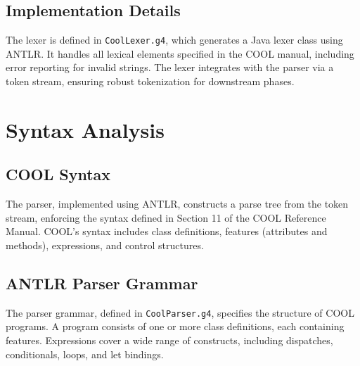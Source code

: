 \documentclass[titlepage]{article}
\begin{document}
\subsection{Implementation Details}

The lexer is defined in \texttt{CoolLexer.g4}, which generates a Java lexer class using ANTLR. It handles all lexical elements specified in the COOL manual, including error reporting for invalid strings. The lexer integrates with the parser via a token stream, ensuring robust tokenization for downstream phases.

\section{Syntax Analysis}

\subsection{COOL Syntax}

The parser, implemented using ANTLR, constructs a parse tree from the token stream, enforcing the syntax defined in Section 11 of the COOL Reference Manual. COOL's syntax includes class definitions, features (attributes and methods), expressions, and control structures.

\subsection{ANTLR Parser Grammar}

The parser grammar, defined in \texttt{CoolParser.g4}, specifies the structure of COOL programs. A program consists of one or more class definitions, each containing features. Expressions cover a wide range of constructs, including dispatches, conditionals, loops, and let bindings.
\end{document}
